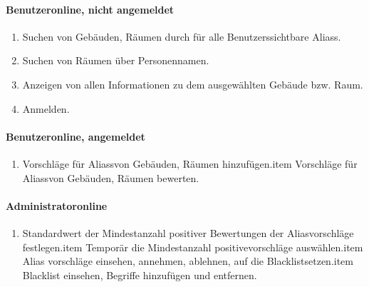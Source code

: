 \paragraph{\Gls{Benutzer}online, nicht angemeldet}
\begin{enumerate}[label=\textbf{/T\arabic*0/}, align=left]
	\item Suchen von Gebäuden, Räumen durch für alle \Glspl{Benutzer}sichtbare \Glspl{Alias}.
	\item Suchen von Räumen über Personennamen.
	\item Anzeigen von allen Informationen zu dem ausgewählten Gebäude bzw. Raum.
	\item Anmelden.
\end{enumerate}

\paragraph{\Gls{Benutzer}online, angemeldet}
\begin{enumerate}[label=\textbf{/T\arabic*0/}, align=left]
	\item Vorschläge für \Glspl{Alias}von Gebäuden, Räumen hinzufügen.item Vorschläge für \Glspl{Alias}von Gebäuden, Räumen bewerten.
\end{enumerate}

\paragraph{\Gls{Administrator}online}
\begin{enumerate}[label=\textbf{/T\arabic*0/}, align=left]
	\item Standardwert der Mindestanzahl positiver Bewertungen der \Gls{Alias}vorschläge festlegen.item Temporär die Mindestanzahl positivevorschläge auswählen.item \Gls{Alias} vorschläge einsehen, annehmen, ablehnen, auf die \Gls{Blacklist}setzen.item \Gls{Blacklist} 
		einsehen, Begriffe hinzufügen und entfernen.
\end{enumerate}
